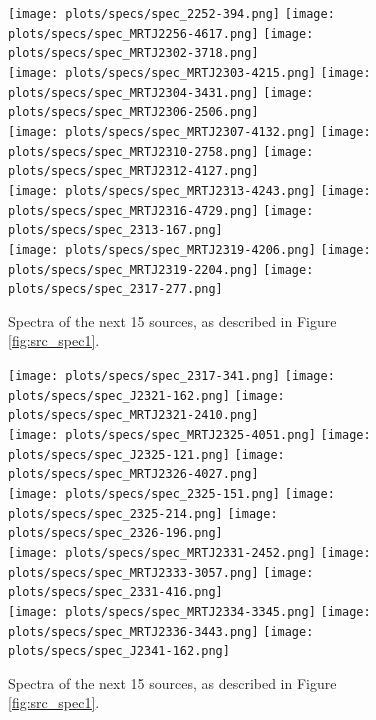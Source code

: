 \documentclass[preprint]{aastex}
\begin{document}
\begin{figure}\centering
\texttt{[image: plots/specs/spec\_2252-394.png]}
\texttt{[image: plots/specs/spec\_MRTJ2256-4617.png]}
\texttt{[image: plots/specs/spec\_MRTJ2302-3718.png]}\\
\texttt{[image: plots/specs/spec\_MRTJ2303-4215.png]}
\texttt{[image: plots/specs/spec\_MRTJ2304-3431.png]}
\texttt{[image: plots/specs/spec\_MRTJ2306-2506.png]}\\
\texttt{[image: plots/specs/spec\_MRTJ2307-4132.png]}
\texttt{[image: plots/specs/spec\_MRTJ2310-2758.png]}
\texttt{[image: plots/specs/spec\_MRTJ2312-4127.png]}\\
\texttt{[image: plots/specs/spec\_MRTJ2313-4243.png]}
\texttt{[image: plots/specs/spec\_MRTJ2316-4729.png]}
\texttt{[image: plots/specs/spec\_2313-167.png]}\\
\texttt{[image: plots/specs/spec\_MRTJ2319-4206.png]}
\texttt{[image: plots/specs/spec\_MRTJ2319-2204.png]}
\texttt{[image: plots/specs/spec\_2317-277.png]}\\
\caption{Spectra of the next 15 sources, as described in Figure \ref{fig:src_spec1}.
}\label{fig:src_spec32}
\end{figure}\clearpage

\begin{figure}\centering
\texttt{[image: plots/specs/spec\_2317-341.png]}
\texttt{[image: plots/specs/spec\_J2321-162.png]}
\texttt{[image: plots/specs/spec\_MRTJ2321-2410.png]}\\
\texttt{[image: plots/specs/spec\_MRTJ2325-4051.png]}
\texttt{[image: plots/specs/spec\_J2325-121.png]}
\texttt{[image: plots/specs/spec\_MRTJ2326-4027.png]}\\
\texttt{[image: plots/specs/spec\_2325-151.png]}
\texttt{[image: plots/specs/spec\_2325-214.png]}
\texttt{[image: plots/specs/spec\_2326-196.png]}\\
\texttt{[image: plots/specs/spec\_MRTJ2331-2452.png]}
\texttt{[image: plots/specs/spec\_MRTJ2333-3057.png]}
\texttt{[image: plots/specs/spec\_2331-416.png]}\\
\texttt{[image: plots/specs/spec\_MRTJ2334-3345.png]}
\texttt{[image: plots/specs/spec\_MRTJ2336-3443.png]}
\texttt{[image: plots/specs/spec\_J2341-162.png]}\\
\caption{Spectra of the next 15 sources, as described in Figure \ref{fig:src_spec1}.
}\label{fig:src_spec33}
\end{figure}\clearpage
\end{document}
